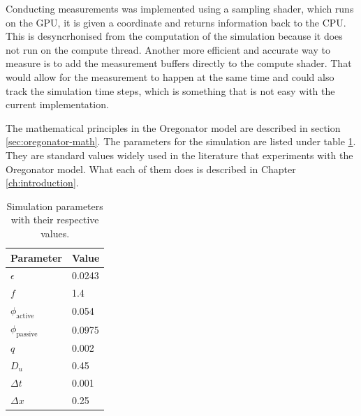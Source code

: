 Conducting measurements was implemented using a sampling shader, which runs on the GPU, it is given a coordinate and returns information
back to the CPU. This is desyncrhonised from the computation of the simulation because it does not run on the compute thread.
Another more efficient and accurate way to measure is to add the measurement buffers directly to the compute shader.
That would allow for the measurement to happen at the same time and could also track the simulation time steps,
which is something that is not easy with the current implementation. 


The mathematical principles in the Oregonator model are described in section \ref{sec:oregonator-math}.
The parameters for the simulation are listed under table \ref{tab:simulation-parameters}. 
They are standard values widely used in the literature that experiments with the Oregonator model.
What each of them does is described in Chapter \ref{ch:introduction}.



\begin{table}
    \centering
    \begin{tabularx}{\textwidth}{|X|X|} 
        \hline
    \textbf{Parameter} & \textbf{Value} \\ \hline
    $\epsilon$         & 0.0243         \\
    $f$                & 1.4            \\ 
    $\phi_{\text{active}}$ & 0.054          \\ 
    $\phi_{\text{passive}}$ & 0.0975          \\
    $q$                & 0.002          \\ 
    $D_u$              & 0.45           \\ 
    $\Delta t$         & 0.001          \\
    $\Delta x$              & 0.25           \\
    \hline
    \end{tabularx}
    \caption{Simulation parameters with their respective values.}
    \label{tab:simulation-parameters}
\end{table}
